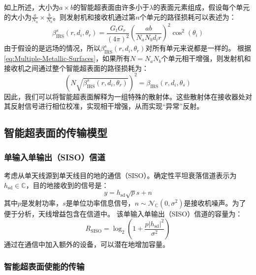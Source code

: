 \documentclass[supercite]{HustGraduPaper}
\begin{document}
如上所述，大小为$a \times b$的智能超表面由许多小于$\lambda$的表面元素组成，假设每个单元的大小为$\frac{a}{N_a} \times \frac{b}{N_b}$。则发射机和接收机通过第$n$个单元的路径损耗可以表述为：
\begin{equation}
	\beta_{\mathrm{IRS}}^{s}\left(r, d_{i}, \theta_{r}\right)=\frac{G_{t} G_{r}}{(4 \pi)^{2}}\left(\frac{a b}{N_{a} N_{b} d_{i} r}\right)^{2} \cos ^{2}\left(\theta_{i}\right)
\end{equation}
由于假设的是远场的情况，所以$\beta_{\mathrm{IRS}}^{s}\left(r, d_{i}, \theta_{r}\right)$对所有单元来说都是一样的。
根据\autoref{eq:Multiple-Metallic-Surfaces}，如果所有$N=N_a N_b$个单元相干增强，则发射机和接收机之间通过整个智能超表面的路径损耗为：
\begin{equation}
	\left(N \sqrt{\beta_{\mathrm{IRS}}^{s}\left(r, d_{i}, \theta_{r}\right)}\right)^{2}=\beta_{\mathrm{IRS}}\left(r, d_{i}, \theta_{s}\right)
\end{equation}
因此，我们可以将智能超表面解释为一组特殊的散射体。这些散射体在接收器处对其反射信号进行相位校准，实现相干增强，从而实现“异常”反射。

\subsection{智能超表面的传输模型}\label{sec:transmission}

\subsubsection{单输入单输出（SISO）信道}

考虑从单天线源到单天线目的地的通信（SISO）。确定性平坦衰落信道表示为$h_{\mathrm{sd}} \in \mathbb{C}$，目的地接收到的信号是：
\begin{equation}
	y=h_{\mathrm{sd}} \sqrt{p} s + n
\end{equation}
其中$p$是发射功率，$s$是单位功率信息信号，$n \sim \mathcal{N}_{\mathbb{C}}\left(0, \sigma^{2}\right)$是接收机噪声。为了便于分析，天线增益包含在信道中。
该单输入单输出（SISO）信道的容量为：
\begin{equation}
	R_{\mathrm{SISO}}=\log _{2}\left(1+\frac{p\left|h_{\mathrm{sd}}\right|^{2}}{\sigma^{2}}\right)
\end{equation}
通过在通信中加入额外的设备，可以潜在地增加容量。

\subsubsection{智能超表面使能的传输}
\end{document}
